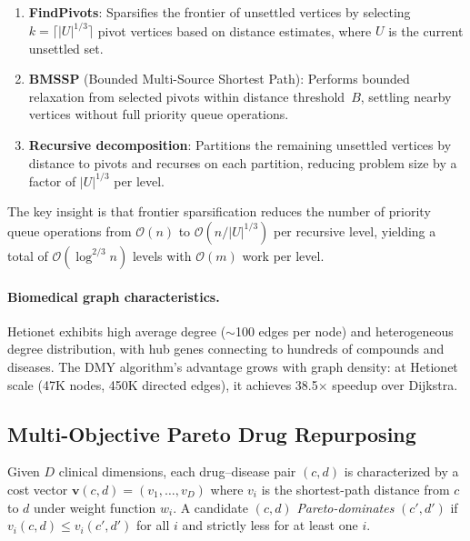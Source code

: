 \documentclass[11pt,a4paper]{article}
\newcommand{\BigO}[1]{\mathcal{O}(#1)}
\begin{document}
\begin{enumerate}
    \item \textbf{FindPivots}: Sparsifies the frontier of unsettled
    vertices by selecting $k = \lceil |U|^{1/3} \rceil$ pivot vertices
    based on distance estimates, where $U$ is the current unsettled set.

    \item \textbf{BMSSP} (Bounded Multi-Source Shortest Path): Performs
    bounded relaxation from selected pivots within distance
    threshold~$B$, settling nearby vertices without full priority
    queue operations.

    \item \textbf{Recursive decomposition}: Partitions the remaining
    unsettled vertices by distance to pivots and recurses on each
    partition, reducing problem size by a factor of $|U|^{1/3}$
    per level.
\end{enumerate}

The key insight is that frontier sparsification reduces the number of
priority queue operations from $\BigO{n}$ to $\BigO{n / |U|^{1/3}}$
per recursive level, yielding a total of $\BigO{\log^{2/3} n}$ levels
with $\BigO{m}$ work per level.

\paragraph{Biomedical graph characteristics.}
Hetionet exhibits high average degree ($\sim$100 edges per node) and
heterogeneous degree distribution, with hub genes connecting to
hundreds of compounds and diseases. The DMY algorithm's advantage grows
with graph density: at Hetionet scale (47K nodes, 450K directed edges),
it achieves 38.5$\times$ speedup over Dijkstra.

\subsection{Multi-Objective Pareto Drug Repurposing}
\label{sec:methods:pareto}

Given $D$ clinical dimensions, each drug--disease pair $(c, d)$ is
characterized by a cost vector
$\mathbf{v}(c, d) = (v_1, \ldots, v_D)$ where $v_i$ is the
shortest-path distance from $c$ to $d$ under weight function $w_i$.
A candidate $(c, d)$ \emph{Pareto-dominates} $(c', d')$ if
$v_i(c, d) \leq v_i(c', d')$ for all $i$ and strictly less for
at least one $i$.
\end{document}
